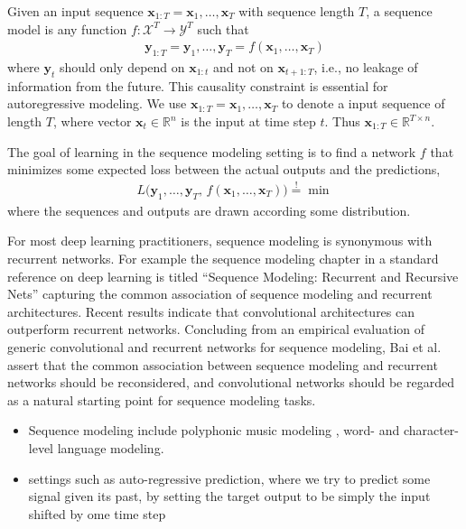 \documentclass{scrartcl}
\begin{document}
Given an input sequence $\mathbf x_{1:T} = \mathbf x_1, \dots, \mathbf x_T$ with sequence length $T$, a sequence model is any function $f: \mathcal X^T \rightarrow \mathcal Y^T$ such that
\begin{align}
\mathbf y_{1:T} = \mathbf y_1, \dots, \mathbf y_T = f(\mathbf x_1,\dots, \mathbf x_T)
\end{align}
where $\mathbf y_t$ should only depend on $\mathbf x_{1:t}$ and not on $\mathbf x_{t+1:T}$, i.e., no leakage of information from the future. This causality constraint is essential for autoregressive modeling. We use $\mathbf x_{1:T} = \mathbf x_1, \dots, \mathbf x_T$ to denote a input sequence of length $T$, where vector $\mathbf x_t \in \mathbb R^n$ is the input at time step $t$. Thus $\mathbf x_{1:T} \in \mathbb R^{T \times n}$.

The goal of learning in the sequence modeling setting is to find a network $f$ that minimizes some expected loss between the actual outputs and the predictions, 
\begin{align}
L \big( \mathbf y_1, \dots, \mathbf y_T, \, f(\mathbf x_1,\dots, \mathbf x_T) \big) \stackrel{\text{!}}{=} \min
\end{align}
where the sequences and outputs are drawn according some distribution.

For most deep learning practitioners, sequence modeling is synonymous with recurrent networks. For example the sequence modeling chapter in a standard reference on deep learning is titled ``Sequence Modeling: Recurrent and Recursive Nets'' \cite{Goodfellow2016} capturing the common association of sequence modeling and recurrent architectures. Recent results indicate that convolutional architectures can outperform recurrent networks. Concluding from an empirical evaluation of generic convolutional and recurrent networks for sequence modeling, Bai et al. \cite{Bai2018} assert that the common association between sequence modeling and recurrent networks should be reconsidered, and convolutional networks should be regarded as a natural starting point for sequence modeling tasks.


\begin{itemize}
\item Sequence modeling include polyphonic music modeling \cite{Oord2016}, word- and character-level language modeling.
\item settings such as auto-regressive prediction, where we try to predict some signal given its past, by setting the target output to be simply the input shifted by ome time step
\end{itemize}
\end{document}
